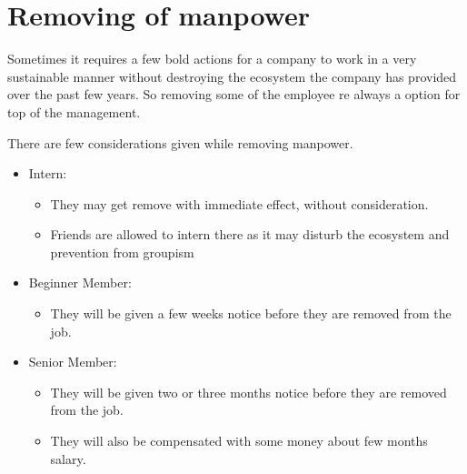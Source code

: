 \section{Removing of manpower}
Sometimes it requires a few bold actions for a company to work in a very sustainable manner without destroying the ecosystem the company has provided over the past few years. So removing some of the employee re always a option for top of the management.

There are few considerations given while removing manpower.
\begin{itemize}
    \item Intern:
    \begin{itemize}
        \item They may get remove with immediate effect, without consideration.
        \item Friends are allowed to intern there as it may disturb the ecosystem and prevention from groupism
    \end{itemize}    
    \item Beginner Member:
    \begin{itemize}
        \item They will be given a few weeks notice before they are removed from the job.
    \end{itemize}
    \item Senior Member:
    \begin{itemize}
        \item They will be given two or three months notice before they are removed from the job.
        \item They will also be compensated with some money about few months salary.
    \end{itemize}
    
\end{itemize}

 